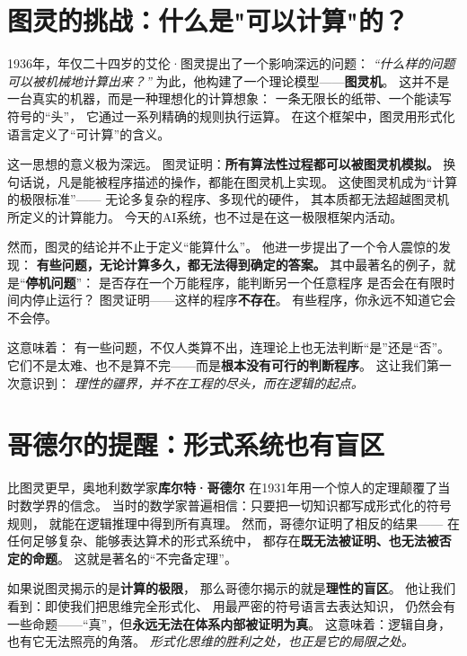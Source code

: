 \section*{图灵的挑战：什么是"可以计算"的？}

1936年，年仅二十四岁的艾伦·图灵提出了一个影响深远的问题：  
\textit{“什么样的问题可以被机械地计算出来？”}  
为此，他构建了一个理论模型——\textbf{图灵机}。  
这并不是一台真实的机器，而是一种理想化的计算想象：  
一条无限长的纸带、一个能读写符号的“头”，  
它通过一系列精确的规则执行运算。  
在这个框架中，图灵用形式化语言定义了“可计算”的含义。

这一思想的意义极为深远。  
图灵证明：\textbf{所有算法性过程都可以被图灵机模拟。}  
换句话说，凡是能被程序描述的操作，都能在图灵机上实现。  
这使图灵机成为“计算的极限标准”——  
无论多复杂的程序、多现代的硬件，  
其本质都无法超越图灵机所定义的计算能力。  
今天的AI系统，也不过是在这一极限框架内活动。

然而，图灵的结论并不止于定义“能算什么”。  
他进一步提出了一个令人震惊的发现：  
\textbf{有些问题，无论计算多久，都无法得到确定的答案。}  
其中最著名的例子，就是“\textbf{停机问题}”：  
是否存在一个万能程序，能判断另一个任意程序  
是否会在有限时间内停止运行？  
图灵证明——这样的程序\textbf{不存在}。  
有些程序，你永远不知道它会不会停。

这意味着：  
有一些问题，不仅人类算不出，连理论上也无法判断“是”还是“否”。  
它们不是太难、也不是算不完——而是\textbf{根本没有可行的判断程序}。  
这让我们第一次意识到：  
\textit{理性的疆界，并不在工程的尽头，而在逻辑的起点。}

\section*{哥德尔的提醒：形式系统也有盲区}

比图灵更早，奥地利数学家\textbf{库尔特·哥德尔}  
在1931年用一个惊人的定理颠覆了当时数学界的信念。  
当时的数学家普遍相信：只要把一切知识都写成形式化的符号规则，  
就能在逻辑推理中得到所有真理。  
然而，哥德尔证明了相反的结果——  
在任何足够复杂、能够表达算术的形式系统中，  
都存在\textbf{既无法被证明、也无法被否定的命题}。  
这就是著名的“不完备定理”。

如果说图灵揭示的是\textbf{计算的极限}，  
那么哥德尔揭示的就是\textbf{理性的盲区}。  
他让我们看到：即使我们把思维完全形式化、  
用最严密的符号语言去表达知识，  
仍然会有一些命题——“真”，但\textbf{永远无法在体系内部被证明为真}。  
这意味着：逻辑自身，也有它无法照亮的角落。  
\textit{形式化思维的胜利之处，也正是它的局限之处。}

